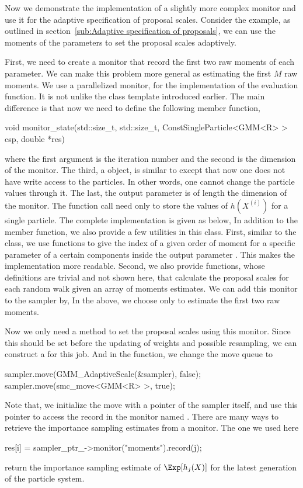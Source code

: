 Now we demonstrate the implementation of a slightly more complex monitor and
use it for the adaptive specification of proposal scales. Consider the \gmm
example, as outlined in section~\ref{sub:Adaptive specification of proposals},
we can use the moments of the parameters to set the proposal scales
adaptively.

First, we need to create a monitor that record the first two raw moments of
each parameter. We can make this problem more general as estimating the first
$M$ raw moments. We use a parallelized monitor,  for
the implementation of the evaluation function. It is not unlike the
 class template introduced earlier. The main difference is
that now we need to define the following member function,
\begin{cppcode}
void monitor_state(std::size_t, std::size_t,
        ConstSingleParticle<GMM<R> > csp, double *res)
\end{cppcode}
where the first argument is the iteration number and the second is the
dimension of the monitor. The third, a  object,
is similar to  except that now one does not have
write access to the particles. In other words, one cannot change the particle
values through it. The last, the output parameter  is of length
the dimension of the monitor. The function call need only to store the values
of $h(X^{(i)})$ for a single particle. The complete implementation is given
as below,
In addition to the  member function, we also provide
a few utilities in this class. First, similar to the  class, we
use functions to give the index of a given order of moment for a specific
parameter of a certain components inside the output parameter .
This makes the implementation more readable. Second, we also provide
functions, whose definitions are trivial and not shown here, that calculate
the proposal scales for each random walk given an array of moments estimates.
We can add this monitor to the sampler by,
In the above, we choose only to estimate the first two raw moments.

Now we only need a method to set the proposal scales using this monitor. Since
this should be set before the updating of weights and possible resampling, we
can construct a  for this job.
And in the  function, we change the move queue to
\begin{cppcode}
sampler.move(GMM_AdaptiveScale(&sampler), false);
sampler.move(smc_move<GMM<R> >, true);
\end{cppcode}
Note that, we initialize the move with a pointer of the sampler itself, and
use this pointer to access the record in the monitor named
. There are many ways to retrieve the importance sampling
estimates from a monitor. The one we used here
\begin{cppcode}
res[i] = sampler_ptr_->monitor("moments").record(j);
\end{cppcode}
return the importance sampling estimate of $\Exp[h_j(X)]$ for the latest
generation of the particle system.

